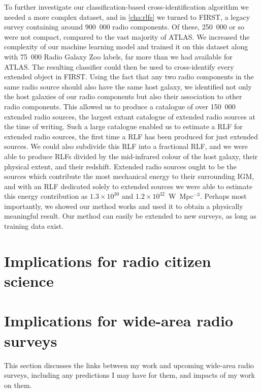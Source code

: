 To further investigate our classification-based cross-identification algorithm we needed a more complex dataset, and in \autoref{cha:rlfs} we turned to FIRST, a legacy survey containing around 900~000 radio components. Of these, 250~000 or so were not compact, compared to the vast majority of ATLAS. We increased the complexity of our machine learning model and trained it on this dataset along with 75~000 Radio Galaxy Zoo labels, far more than we had available for ATLAS. The resulting classifier could then be used to cross-identify every extended object in FIRST. Using the fact that any two radio components in the same radio source should also have the same host galaxy, we identified not only the host galaxies of our radio components but also their association to other radio components. This allowed us to produce a catalogue of over 150~000 extended radio sources, the largest extant catalogue of extended radio sources at the time of writing. Such a large catalogue enabled us to estimate a RLF for extended radio sources, the first time a RLF has been produced for just extended sources. We could also subdivide this RLF into a fractional RLF, and we were able to produce RLFs divided by the mid-infrared colour of the host galaxy, their physical extent, and their redshift. Extended radio sources ought to be the sources which contribute the most mechanical energy to their surrounding IGM, and with an RLF dedicated solely to extended sources we were able to estimate this energy contribution as $1.3 \times 10^{30}$ and $1.2 \times 10^{32}$~W~Mpc$^{-3}$. Perhaps most importantly, we showed our method works and used it to obtain a physically meaningful result. Our method can easily be extended to new surveys, as long as training data exist.


\section{Implications for radio citizen science}
\label{sec:implications-citizen-science}

\section{Implications for wide-area radio surveys}
\label{sec:implications-wide-area-radio-surveys}

    This section discusses the links between my work and upcoming wide-area radio surveys, including any predictions I may have for them, and impacts of my work on them.


